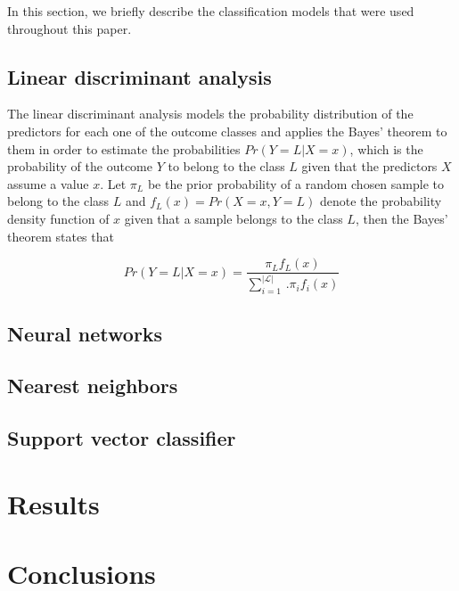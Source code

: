 \documentclass[conference]{IEEEtran}
\begin{document}
In this section, we briefly describe the classification models that were used throughout this paper.

\subsection{Linear discriminant analysis}
The linear discriminant analysis models the probability distribution of the predictors for each one of the outcome classes and applies the Bayes' theorem to them in order to estimate the probabilities $Pr(Y=L | X=x)$, which is the probability of the outcome $Y$ to belong to the class $L$ given that the predictors $X$ assume a value $x$. Let $\pi_L$ be the prior probability of a random chosen sample to belong to the class $L$ and $f_L(x) = Pr(X=x, Y=L)$ denote the probability density function of $x$ given that a sample belongs to the class $L$, then the Bayes' theorem states that

\begin{equation}
  Pr(Y=L | X=x) = \frac{\pi_L f_L(x)}{\sum_{i = 1}^{|\mathcal{L}|}\,. \pi_i f_i(x)}
\end{equation}

\subsection{Neural networks}

\subsection{Nearest neighbors}

\subsection{Support vector classifier}

\section{Results} \label{sec:results}






\section{Conclusions}\label{sec:conclusions}
\end{document}
